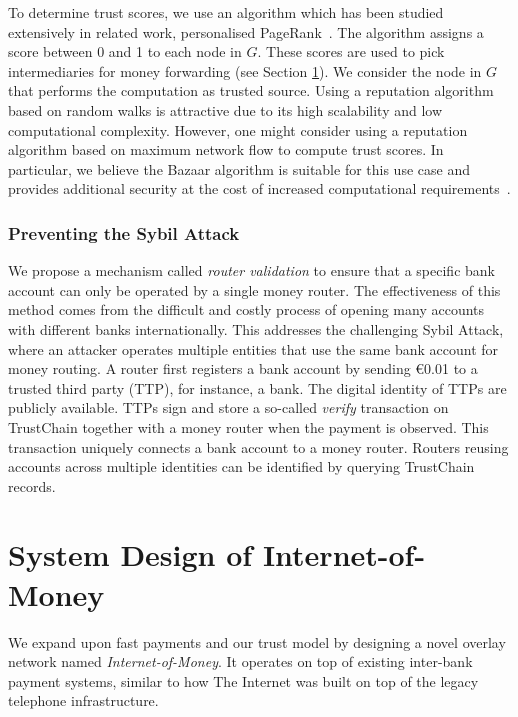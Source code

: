 To determine trust scores, we use an algorithm which has been studied extensively in related work, personalised PageRank~\cite{page1999pagerank}. %
The algorithm assigns a score between 0 and 1 to each node in $ G $.
These scores are used to pick intermediaries for money forwarding (see Section \ref{sec:system_design}).
We consider the node in $ G $ that performs the computation as trusted source.
Using a reputation algorithm based on random walks is attractive due to its high scalability and low computational complexity.
However, one might consider using a reputation algorithm based on maximum network flow to compute trust scores.
In particular, we believe the Bazaar algorithm is suitable for this use case and provides additional security at the cost of increased computational requirements~\cite{post2011bazaar}.

\subsubsection*{Preventing the Sybil Attack}
We propose a mechanism called \emph{router validation} to ensure that a specific bank account can only be operated by a single money router.
The effectiveness of this method comes from the difficult and costly process of opening many accounts with different banks internationally. %
This addresses the challenging Sybil Attack, where an attacker operates multiple entities that use the same bank account for money routing.
A router first registers a bank account by sending \euro 0.01 to a trusted third party (TTP), for instance, a bank.
The digital identity of TTPs are publicly available.
TTPs sign and store a so-called \emph{verify} transaction on TrustChain together with a money router when the payment is observed.
This transaction uniquely connects a bank account to a money router.
Routers reusing accounts across multiple identities can be identified by querying TrustChain records.

\section{System Design of Internet-of-Money}
\label{sec:system_design}
We expand upon fast payments and our trust model by designing a novel overlay network named \emph{Internet-of-Money}.
It operates on top of existing inter-bank payment systems, similar to how The Internet was built on top of the legacy telephone infrastructure.

